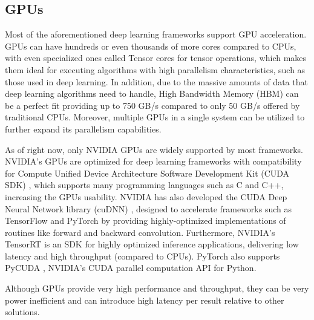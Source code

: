 \subsection{GPUs}
Most of the aforementioned deep learning frameworks support GPU acceleration. GPUs can have hundreds or even thousands of more cores compared to CPUs, with even specialized ones called Tensor cores for tensor operations, which makes them ideal for executing algorithms with high parallelism characteristics, such as those used in deep learning. In addition, due to the massive amounts of data that deep learning algorithms need to handle, High Bandwidth Memory (HBM) can be a perfect fit providing up to 750 GB/s compared to only 50 GB/s offered by traditional CPUs. Moreover, multiple GPUs in a single system can be utilized to further expand its parallelism capabilities.

As of right now, only NVIDIA GPUs are widely supported by most frameworks. NVIDIA's GPUs are optimized for deep learning frameworks with compatibility for Compute Unified Device Architecture Software Development Kit (CUDA SDK) \cite{NVIDIA-CUDA}, which supports many programming languages such as C and C++, increasing the GPUs usability. NVIDIA has also developed the CUDA Deep Neural Network library (cuDNN) \cite{cuDNN-Efficient-Primitives-for-Deep-Learning} \cite{NVIDIA-cuDNN}, designed to accelerate frameworks such as TensorFlow and PyTorch by providing highly-optimized implementations of routines like forward and backward convolution. Furthermore, NVIDIA's TensorRT \cite{NVIDIA-TensorRT} is an SDK for high\-ly optimized inference applications, delivering low latency and high throughput (compared to CPUs). PyTorch also supports PyCUDA \cite{NVIDIA-PyCUDA}, NVIDIA's CUDA parallel computation API for Python.

Although GPUs provide very high performance and throughput, they can be very power inefficient and can introduce high latency per result relative to other solutions.

